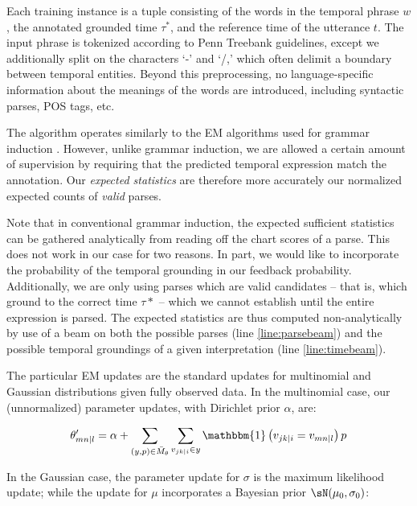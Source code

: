 Each training instance is a tuple consisting of the words in the temporal
	phrase $w$, the annotated grounded time $\tau^*$, and the reference time
	of the utterance $t$.
The input phrase is tokenized according to Penn Treebank guidelines,
	except we additionally split on the characters `-' and `/,' which
	often delimit a boundary between temporal entities.
Beyond this preprocessing, no language-specific information about the meanings
	of the words are introduced, including syntactic parses, POS tags, etc.

The algorithm operates similarly to the EM algorithms used for grammar induction
	\cite{key:2004klein-induction,key:1992carroll-induction}.
However, unlike grammar induction, we are allowed a certain amount of
	supervision by requiring that the predicted temporal expression
	match the annotation.
Our \textit{expected statistics} are therefore more accurately our normalized
	expected counts of \textit{valid} parses.

Note that in conventional grammar induction, the expected sufficient statistics
	can be gathered analytically from reading off the chart scores of a parse.
This does not work in our case for two reasons.
In part, we would like to incorporate the probability of the temporal
	grounding in our feedback probability.
Additionally, we are only using parses which are valid candidates -- that is,
	which ground to the correct time $\tau*$ -- which we cannot establish
	until the entire expression is parsed.
The expected statistics are thus computed non-analytically by use of
	a beam on both the possible parses (line \ref{line:parsebeam}) and the
	possible temporal groundings of a given interpretation (line
	\ref{line:timebeam}).

The particular EM updates are the standard
	updates for multinomial and Gaussian distributions given fully observed data.
In the multinomial case, our (unnormalized) parameter updates, with
	Dirichlet prior $\alpha$, are:

\begin{equation}
	\theta_{mn \mid l}' =
		\alpha + 
		\sum\limits_{(y,p) \in \bar M_\theta} \sum\limits_{v_{jk \mid i} \in y}
			\mathbbm{1}\left(v_{jk \mid i} = v_{mn \mid l}\right) p
\label{eqn:multinomialEM}
\end{equation}

In the Gaussian case, the parameter update for $\sigma$ is the maximum
	likelihood update; while the update for $\mu$ incorporates a
	Bayesian prior $\sN(\mu_0,\sigma_0)$:

